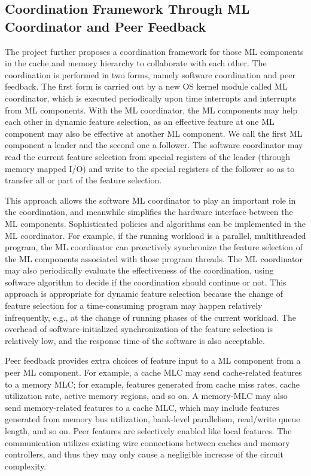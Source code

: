 
\subsection{Coordination Framework Through ML Coordinator and Peer
Feedback}

The project further proposes a coordination framework for those ML components in
the cache and memory hierarchy to collaborate with each other.  The coordination
is performed in two forms, namely software coordination and peer feedback.  The
first form is carried out by a new OS kernel module called ML coordinator, which
is executed periodically upon time interrupts and interrupts from ML components.
With the ML coordinator, the ML components may help each other in dynamic
feature selection, as an effective feature at one ML component may also be
effective at another ML component.  We call the first ML component a leader and
the second one a follower.  The software coordinator may read the current
feature selection from special registers of the leader (through memory mapped
I/O) and write to the special registers of the follower so as to transfer
all or part of the feature selection.

This approach allows the software ML coordinator to play an important role in
the coordination, and meanwhile simplifies the hardware interface between the ML
components.  Sophisticated policies and algorithms can be implemented in the ML
coordinator.  For example, if the running workload is a parallel, multithreaded
program, the ML coordinator can proactively synchronize the feature selection of
the ML components associated with those program threads. The ML coordinator may
also periodically evaluate the effectiveness of the coordination, using software
algorithm to decide if the coordination should continue or not.  This approach
is appropriate for dynamic feature selection because the change of feature
selection for a time-consuming program may happen relatively infrequently, e.g.,
at the change of running phases of the current workload.  The overhead of
software-initialized synchronization of the feature selection is relatively low,
and the response time of the software is also acceptable.

Peer feedback provides extra choices of feature input to a ML component from a
peer ML component. For example, a cache MLC may send cache-related features to a
memory MLC; for example, features generated from cache miss rates, cache
utilization rate, active memory regions, and so on.  A memory-MLC may also send
memory-related features to a cache MLC, which may include features generated
from memory bus utilization, bank-level parallelism, read/write queue length,
and so on.  Peer features are selectively enabled like local features.  The
communication utilizes existing wire connections between caches and memory
controllers, and thus they may only cause a negligible increase of the circuit
complexity.

